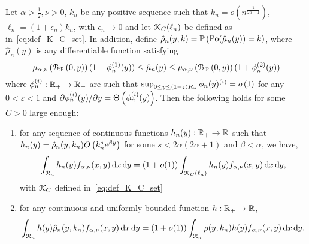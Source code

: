 \begin{lemma}\label{lem:concentration_argument_rho_approximation}
Let $\alpha > \frac{1}{2}, \nu > 0$, $k_n$ be any positive sequence such that $k_n = o(n^{\frac{1}{2\alpha + 1}})$, $\ell_n = (1 + \epsilon_n)k_n$, with $\epsilon_n \to 0$ and let ${\mathcal K}_{C}(\ell_n)$ be defined as in~\eqref{eq:def_K_C_set}. In addition, define $\hat{\rho}_n(y,k) = \mathbb{P}\left({\mathrm{Po}}(\hat{\mu}_n(y)) = k\right)$, where $\hat{\mu}_n(y)$ is any differentiable function satisfying 
\[
	\mu_{\alpha,\nu}\left({\mathcal B}_{{\mathcal P}}\left(0,y\right)\right)(1 - \phi_n^{(1)}(y)) \le \hat{\mu}_n(y) \le \mu_{\alpha,\nu}\left({\mathcal B}_{{\mathcal P}}\left(0,y\right)\right)(1 + \phi_n^{(2)}(y))
\]
where $\phi_n^{(i)} : {\mathbb R}_+ \to {\ensuremath{\mathbb R}}_+$ are such that $\sup_{0 \le y \le (1-\varepsilon)R_n} \phi_n(y)^{(i)} = o\left(1\right)$ for any $0 < \varepsilon < 1$ and $\partial \phi_n^{(i)}(y)/\partial y = \Theta\left(\phi_n^{(i)}(y)\right)$. Then the following holds for some $C > 0$ large enough:
\begin{enumerate}
\item for any sequence of continuous functions $h_n(y) : {\mathbb R}_+ \to {\ensuremath{\mathbb R}}$ such that $h_n(y) = \hat{\rho}_n(y,k_n) O\left(k_n^s e^{\beta y}\right)$   for some $s < 2\alpha(2\alpha + 1)$ and $\beta < \alpha$, we have,
\[
	\int_{{\mathcal R}_n} h_n(y) f_{\alpha,\nu}(x,y) \operatorname{\mathrm{d}\hspace{-2pt}} x \operatorname{\mathrm{d}\hspace{-2pt}} y 
	= (1 + o(1)) \int_{{\mathcal K}_{C}(\ell_n)} h_n(y) f_{\alpha,\nu}(x,y) \operatorname{\mathrm{d}\hspace{-2pt}} x \operatorname{\mathrm{d}\hspace{-2pt}} y,
\]
with ${\mathcal K}_{C}$ defined in~\eqref{eq:def_K_C_set}
\item for any continuous and uniformly bounded function $h : {\mathbb R}_+ \to {\ensuremath{\mathbb R}}$,
\[
	\int_{{\mathcal R}_n} h(y) \hat{\rho}_n(y,k_n) f_{\alpha,\nu}(x,y) \operatorname{\mathrm{d}\hspace{-2pt}} x \operatorname{\mathrm{d}\hspace{-2pt}} y 
	= (1 + o(1)) \int_{{\mathcal R}_n} \rho(y,k_n) h(y) f_{\alpha,\nu}(x,y) \operatorname{\mathrm{d}\hspace{-2pt}} x \operatorname{\mathrm{d}\hspace{-2pt}} y.
\]
\end{enumerate}
\end{lemma}

